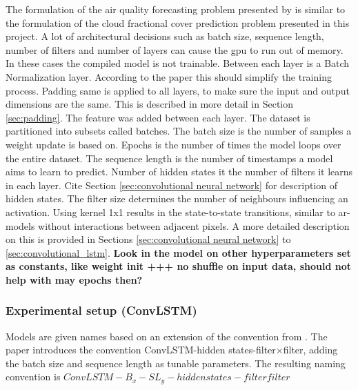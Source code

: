 The formulation of the air quality forecasting problem presented by  \citeauthor{SunAirLSTM} is similar to the formulation of the cloud fractional cover prediction problem presented in this project. %
A lot of architectural decisions such as batch size, sequence length, number of filters and number of layers can cause the \acrshort{gpu} to run out of memory. In these cases the compiled model is not trainable. Between each layer is a Batch Normalization layer. According to the paper  this should simplify the training process. Padding same is applied to all layers, to make sure the input and output dimensions are the same. This is described in more detail in Section \ref{sec:padding}. The feature was added between each layer. The dataset is partitioned into subsets called batches. The batch size is the number of samples a weight update is based on. Epochs is the number of times the model loops over the entire dataset. The sequence length is the number of timestamps a model aims to learn to predict. Number of hidden states it the number of filters it learns in each layer. Cite Section \ref{sec:convolutional neural network} for description of hidden states. 
The filter size determines the number of neighbours influencing an activation. Using kernel 1x1 results in the state-to-state transitions, similar to \acrshort{ar}-models without interactions between adjacent pixels. A more detailed description on this is provided in Sections \ref{sec:convolutional neural network} to \ref{sec:convolutional_lstm}. \textbf{Look in the model on other hyperparameters set as constants, like weight init +++ no shuffle on input data, should not help with may epochs then?}

\subsubsection{Experimental setup (ConvLSTM)}
Models are given names based on an extension of the convention from . The paper introduces the convention ConvLSTM-hidden states-filter$\times$filter, adding the batch size and sequence length as tunable parameters. The resulting naming convention is \newline $ConvLSTM-B_{x}-SL_{y}-hidden states-filter$\times$filter$

